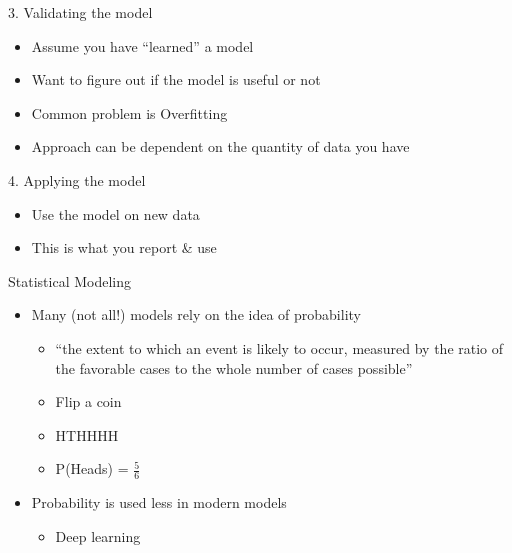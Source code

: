 \documentclass[aspectratio=169]{beamer}
\begin{document}
\begin{frame}{3. Validating the model}

\begin{itemize}
\item Assume you have ``learned'' a model
\item Want to figure out if the model is useful or not
\item Common problem is Overfitting
\item Approach can be dependent on the quantity of data you have
\end{itemize}
\end{frame}
\begin{frame}{4. Applying the model}

\begin{itemize}
\item Use the model on new data
\item This is what you report \& use
\end{itemize}
\end{frame}
\begin{frame}{Statistical Modeling}

\begin{itemize}
\item Many (not all!) models rely on the idea of probability
	\begin{itemize}
		\item ``the extent to which an event is likely to occur, measured by the ratio of the favorable cases to the whole number of cases possible''
		\item Flip a coin
		\item H\hspace{1em}T\hspace{1em}H\hspace{1em}H\hspace{1em}H\hspace{1em}H
		\item P(Heads) = $\frac{5}{6}$
	\end{itemize}
\item Probability is used less in modern models
	\begin{itemize}
		\item Deep learning
	\end{itemize}

\end{itemize}
\end{frame}
\end{document}
